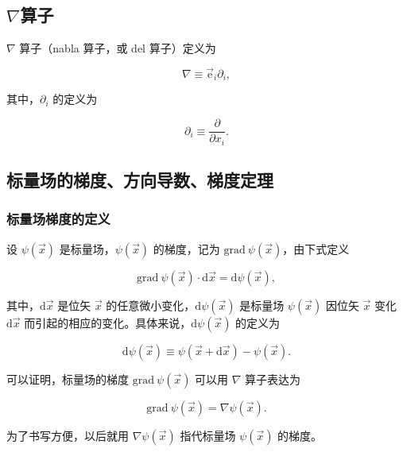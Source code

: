 \subsection{\texorpdfstring{$\nabla$算子}{nabla算子}}

$\nabla $ 算子（nabla 算子，或 del 算子）定义为

\begin{equation}
\nabla
\equiv \vec{\mathrm{e}}_i\partial_i,
\end{equation}

其中，$\partial_i $ 的定义为

\begin{equation}
\partial_i\equiv \frac{\partial }{\partial x_i}.
\end{equation}

\subsection{标量场的梯度、方向导数、梯度定理}

\subsubsection{标量场梯度的定义}

设 $\psi(\vec{x}) $ 是标量场，$\psi(\vec{x}) $ 的梯度，记为 $\mathrm{grad}~\psi(\vec{x}) $，由下式定义

\begin{equation}
\mathrm{grad}~\psi(\vec{x})\cdot\mathrm{d}\vec{x}
=\mathrm{d}\psi(\vec{x}),
\end{equation}

其中，$\mathrm{d}\vec{x} $ 是位矢 $\vec{x} $ 的任意微小变化，$\mathrm{d}\psi(\vec{x}) $ 是标量场 $\psi(\vec{x}) $ 因位矢 $\vec{x} $ 变化 $\mathrm{d}\vec{x} $ 而引起的相应的变化。具体来说，$\mathrm{d}\psi(\vec{x}) $ 的定义为

\begin{equation}
\mathrm{d}\psi(\vec{x})
\equiv \psi(\vec{x}+\mathrm{d}\vec{x})-\psi(\vec{x}).
\end{equation}

可以证明，标量场的梯度 $\mathrm{grad}~\psi(\vec{x}) $ 可以用 $\nabla $ 算子表达为

\begin{equation}
\mathrm{grad}~\psi(\vec{x})
=\nabla \psi(\vec{x}).
\end{equation}

为了书写方便，以后就用 $\nabla \psi(\vec{x}) $ 指代标量场 $\psi(\vec{x}) $ 的梯度。

